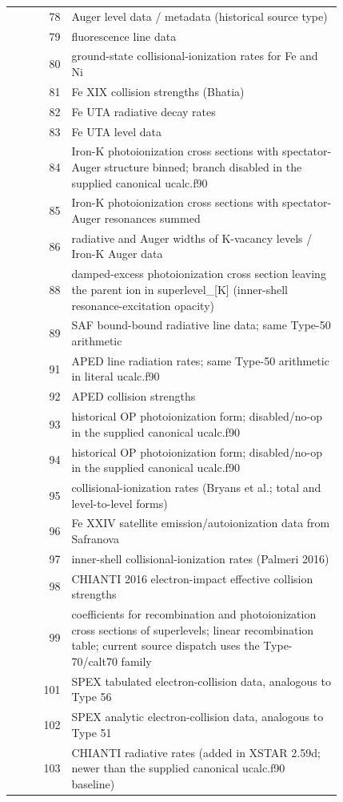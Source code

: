 \documentclass[
  10pt,
]{article}
\begin{document}
\begin{longtable}[]{@{}r p{0.82\linewidth}@{}}
78 & Auger level data / metadata (historical source type) \\
79 & fluorescence line data \\
80 & ground-state collisional-ionization rates for Fe and Ni \\
81 & Fe XIX collision strengths (Bhatia) \\
82 & Fe UTA radiative decay rates \\
83 & Fe UTA level data \\
84 & Iron-K photoionization cross sections with spectator-Auger structure binned; branch disabled in the supplied canonical ucalc.f90 \\
85 & Iron-K photoionization cross sections with spectator-Auger resonances summed \\
86 & radiative and Auger widths of K-vacancy levels / Iron-K Auger data \\
88 & damped-excess photoionization cross section leaving the parent ion in superlevel\_[K] (inner-shell resonance-excitation opacity) \\
89 & SAF bound-bound radiative line data; same Type-50 arithmetic \\
91 & APED line radiation rates; same Type-50 arithmetic in literal ucalc.f90 \\
92 & APED collision strengths \\
93 & historical OP photoionization form; disabled/no-op in the supplied canonical ucalc.f90 \\
94 & historical OP photoionization form; disabled/no-op in the supplied canonical ucalc.f90 \\
95 & collisional-ionization rates (Bryans et al.; total and level-to-level forms) \\
96 & Fe XXIV satellite emission/autoionization data from Safranova \\
97 & inner-shell collisional-ionization rates (Palmeri 2016) \\
98 & CHIANTI 2016 electron-impact effective collision strengths \\
99 & coefficients for recombination and photoionization cross sections of superlevels; linear recombination table; current source dispatch uses the Type-70/calt70 family \\
101 & SPEX tabulated electron-collision data, analogous to Type 56 \\
102 & SPEX analytic electron-collision data, analogous to Type 51 \\
103 & CHIANTI radiative rates (added in XSTAR 2.59d; newer than the supplied canonical ucalc.f90 baseline) \\
\end{longtable}
\end{document}
